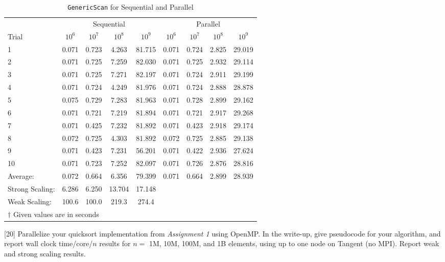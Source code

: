 \documentclass[addpoints]{exam}
\begin{document}
\begin{questions}
\begin{solution}
\begin{table}[H]
\centering
\caption{{\tt GenericScan} for Sequential and Parallel}
\begin{tabular}{l | c c c c | c c c c}
\hline\hline
& \multicolumn{4}{c}{Sequential} &  \multicolumn{4}{c}{Parallel}\\
Trial & $10^{6}$ & $10^{7}$ & $10^{8}$ & $10^{9}$ & $10^{6}$ & $10^{7}$ & $10^{8}$ & $10^{9}$ \\
\hline
1 & 0.071 & 0.723 & \phantom{1}4.263 & 81.715 & 0.071 & 0.724 & 2.825 & 29.019\\
2 & 0.071 & 0.725 & \phantom{1}7.259 & 82.030 & 0.071 & 0.725 & 2.932 & 29.114\\
3 & 0.071 & 0.725 & \phantom{1}7.271 & 82.197 & 0.071 & 0.724 & 2.911 & 29.199\\
4 & 0.071 & 0.724 & \phantom{1}4.249 & 81.976 & 0.071 & 0.724 & 2.888 & 28.878\\
5 & 0.075 & 0.729 & \phantom{1}7.283 & 81.963 & 0.071 & 0.728 & 2.899 & 29.162\\
6 & 0.071 & 0.721 & \phantom{1}7.219 & 81.894 & 0.071 & 0.721 & 2.917 & 29.268\\
7 & 0.071 & 0.425 & \phantom{1}7.232 & 81.892 & 0.071 & 0.423 & 2.918 & 29.174\\
8 & 0.072 & 0.725 & \phantom{1}4.303 & 81.892 & 0.072 & 0.725 & 2.885 & 29.138\\
9 & 0.071 & 0.423 & \phantom{1}7.231 & 56.201 & 0.071 & 0.422 & 2.936 & 27.624\\
10 & 0.071 & 0.723 & \phantom{1}7.252 & 82.097 & 0.071 & 0.726 & 2.876 & 28.816\\
\hline
Average: & 0.072 & 0.664 & 6.356 & 79.399 & 0.071 & 0.664 & 2.899 & 28.939\\
\hline
Strong Scaling: & 6.286 & 6.250 & 13.704 & 17.148\\
Weak Scaling: & 100.6 & 100.0 & 219.3 & 274.4\\
\hline\hline
\multicolumn{5}{l}{{\scriptsize $\dagger$ Given values are in seconds}}
\end{tabular}
\label{table:gen_scan}
\end{table}
\end{solution}

\newpage

[20]
Parallelize your quicksort implementation from {\em Assignment 1} using OpenMP. In the write-up, give pseudocode for your algorithm, and report wall clock time/core/$n$ results for $n=$ 1M, 10M, 100M, and 1B elements, using up to one node on Tangent (no MPI). Report weak and strong scaling results.


\end{questions}
\end{document}
